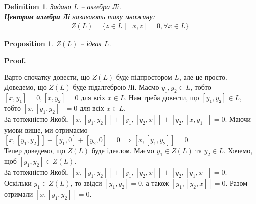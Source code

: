\documentclass[a4paper, 10pt]{article}
\makeatletter
\theoremstyle{theoremdd}
\newtheorem{definition}[theorem]{Definition}
\newtheorem{proposition}[theorem]{Proposition}
\renewenvironment{proof}[1][Proof.\\]{\par
\pushQED{\hfill \qed}%
\normalfont \topsep6\p@\@plus6\p@\relax
\trivlist
\item\relax
{\bfseries
#1\@addpunct{.}}\hspace\labelsep\ignorespaces
}{%
\popQED\endtrivlist\@endpefalse
}
\makeatother
\begin{document}
\begin{definition}
Задано $L$ -- алгебра Лі.\\
\textbf{Центром алгебри Лі} називають таку множину:
\begin{align*}
Z(L) = \{z \in L \mid [x,z] = 0, \forall x \in L\}
\end{align*}
\end{definition}

\begin{proposition}
$Z(L)$ -- ідеал $L$.
\end{proposition}

\begin{proof}
Варто спочатку довести, що $Z(L)$ буде підпростором $L$, але це просто.\\
Доведемо, що $Z(L)$ буде підалгеброю Лі. Маємо $y_1,y_2 \in L$, тобто $[x,y_1] = 0, [x,y_2] = 0$ для всіх $x \in L$. Нам треба довести, що $[y_1,y_2] \in L$, тобто $[x,[y_1,y_2]] = 0$ для всіх $x \in L$.\\
За тотожністю Якобі, $[x,[y_1,y_2]] + [y_1,[y_2,x]] + [y_2,[x,y_1]] = 0$. Маючи умови вище, ми отримаємо $[x,[y_1,y_2]] + [y_1,0] + [y_2,0] = 0 \implies [x,[y_1,y_2]] = 0$.\\
Тепер доведемо, що $Z(L)$ буде ідеалом. Маємо $y_1 \in Z(L)$ та $y_2 \in L$. Хочемо, щоб $[y_1,y_2] \in Z(L)$.\\
За тотожністю Якобі, $[x,[y_1,y_2]] + [y_1,[y_2,x]] + [y_2,[y_1,x]] = 0$. Оскільки $y_1 \in Z(L)$, то звідси $[y_1,y_2] = 0$, а також $[y_1,[y_2,x]] = 0$. Разом отримали $[x,[y_1,y_2]] = 0$.
\end{proof}
\end{document}
